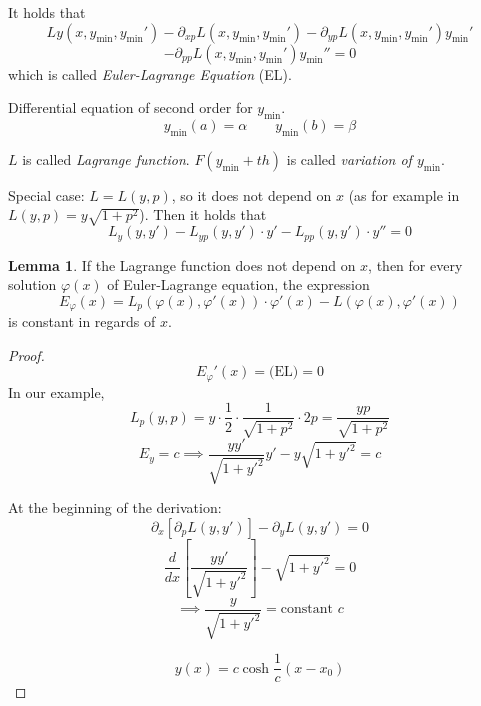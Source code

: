 \documentclass[a4paper,landscape,twocolumn]{article}
\theoremstyle{definition}
\newtheorem{lemma}{Lemma}
\begin{document}
It holds that
\[ Ly(x, y_{\min}, y_{\min}') - \partial_{xp} L(x, y_{\min}, y_{\min}') - \partial_{yp} L(x, y_{\min}, y_{\min}') y_{\min}' \]
\[ - \partial_{pp} L(x, y_{\min}, y_{\min}') y_{\min}'' = 0 \]
which is called \emph{Euler-Lagrange Equation} (EL).

Differential equation of second order for $y_{\min}$.
\[ y_{\min}(a) = \alpha \qquad y_{\min}(b) = \beta \]

$L$ is called \emph{Lagrange function}.
$F(y_{\min} + th)$ is called \emph{variation of $y_{\min}$}.

Special case: $L = L(y, p)$, so it does not depend on $x$
(as for example in $L(y, p) = y \sqrt{1 + p^2}$).
Then it holds that
\[ L_y(y, y') - L_{yp}(y, y') \cdot y' - L_{pp}(y, y') \cdot y'' = 0 \]

\begin{lemma}
  If the Lagrange function does not depend on $x$,
  then for every solution $\varphi(x)$ of Euler-Lagrange
  equation, the expression
  \[ E_{\varphi}(x) = L_p(\varphi(x), \varphi'(x)) \cdot \varphi'(x) - L(\varphi(x), \varphi'(x)) \]
  is constant in regards of $x$.
\end{lemma}
\begin{proof}
  \[ E_{\varphi}'(x) = \text{(EL)} = 0 \]
  In our example,
  \[ L_p(y, p) = y \cdot \frac12 \cdot \frac{1}{\sqrt{1 + p^2}} \cdot 2p = \frac{yp}{\sqrt{1 + p^2}} \]
  \[ E_y = c \implies \frac{y y'}{\sqrt{1 + y'^2}} y' - y \sqrt{1 + y'^2} = c \]

  At the beginning of the derivation:
  \[ \partial_x [\partial_p L(y, y')] - \partial_y L(y, y') = 0 \]
  \[ \frac{d}{dx} \left[\frac{yy'}{\sqrt{1 + y'^2}}\right] - \sqrt{1 + y'^2} = 0 \]
  \[ \implies \frac{y}{\sqrt{1 + y'^2}} = \text{constant } c \]

  \[ y(x) = c \cosh{\frac{1}{c}(x - x_0)} \]
\end{proof}



\clearpage
\begin{otherlanguage}{ngerman}
\printindex[German]
\end{otherlanguage}
\printindex[English]
\end{document}
